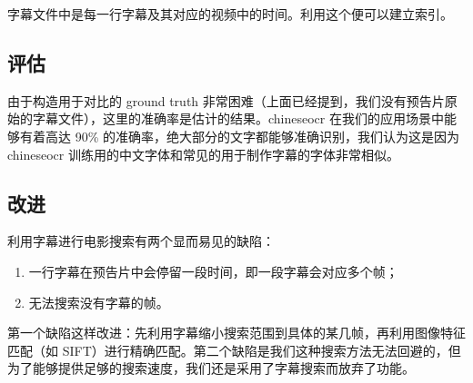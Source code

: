 \documentclass[main.tex]{subfiles}
\begin{document}
字幕文件中是每一行字幕及其对应的视频中的时间。利用这个便可以建立索引。

\subsection{评估}

由于构造用于对比的 ground truth 非常困难（上面已经提到，我们没有预告片原始的字幕文件），这里的准确率是估计的结果。chineseocr 在我们的应用场景中能够有着高达 90\% 的准确率，绝大部分的文字都能够准确识别，我们认为这是因为 chineseocr 训练用的中文字体和常见的用于制作字幕的字体非常相似。

\subsection{改进}

利用字幕进行电影搜索有两个显而易见的缺陷：

\begin{enumerate}
    \item 一行字幕在预告片中会停留一段时间，即一段字幕会对应多个帧；
    \item 无法搜索没有字幕的帧。
\end{enumerate}

第一个缺陷这样改进：先利用字幕缩小搜索范围到具体的某几帧，再利用图像特征匹配（如 SIFT）进行精确匹配。第二个缺陷是我们这种搜索方法无法回避的，但为了能够提供足够的搜索速度，我们还是采用了字幕搜索而放弃了功能。
\end{document}
